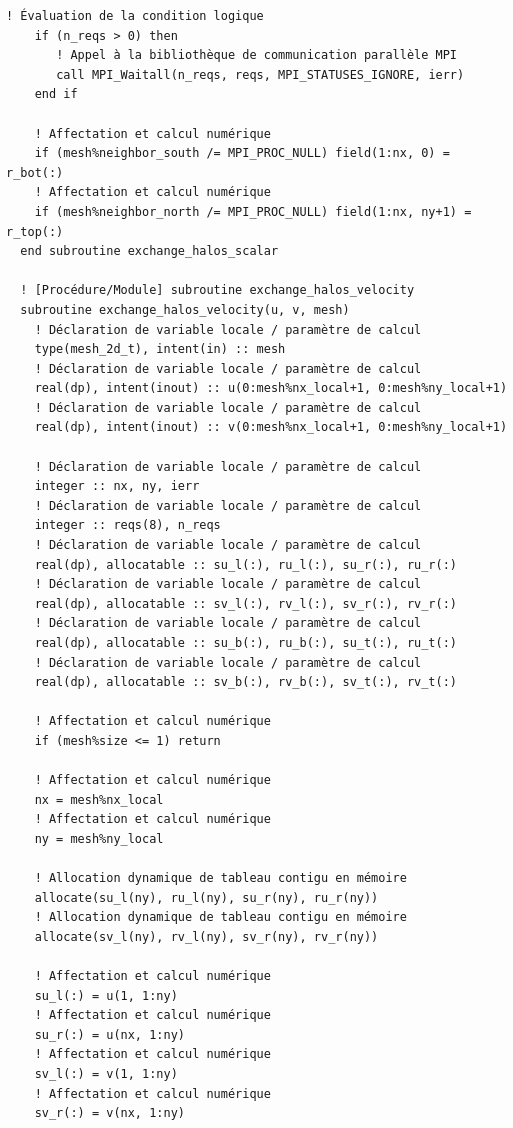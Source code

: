 \documentclass[10pt,a4paper,oneside]{book}
\begin{document}
\begin{lstlisting}[language={[95]Fortran}]
    ! Évaluation de la condition logique
    if (n_reqs > 0) then
       ! Appel à la bibliothèque de communication parallèle MPI
       call MPI_Waitall(n_reqs, reqs, MPI_STATUSES_IGNORE, ierr)
    end if

    ! Affectation et calcul numérique
    if (mesh%neighbor_south /= MPI_PROC_NULL) field(1:nx, 0) = r_bot(:)
    ! Affectation et calcul numérique
    if (mesh%neighbor_north /= MPI_PROC_NULL) field(1:nx, ny+1) = r_top(:)
  end subroutine exchange_halos_scalar

  ! [Procédure/Module] subroutine exchange_halos_velocity
  subroutine exchange_halos_velocity(u, v, mesh)
    ! Déclaration de variable locale / paramètre de calcul
    type(mesh_2d_t), intent(in) :: mesh
    ! Déclaration de variable locale / paramètre de calcul
    real(dp), intent(inout) :: u(0:mesh%nx_local+1, 0:mesh%ny_local+1)
    ! Déclaration de variable locale / paramètre de calcul
    real(dp), intent(inout) :: v(0:mesh%nx_local+1, 0:mesh%ny_local+1)

    ! Déclaration de variable locale / paramètre de calcul
    integer :: nx, ny, ierr
    ! Déclaration de variable locale / paramètre de calcul
    integer :: reqs(8), n_reqs
    ! Déclaration de variable locale / paramètre de calcul
    real(dp), allocatable :: su_l(:), ru_l(:), su_r(:), ru_r(:)
    ! Déclaration de variable locale / paramètre de calcul
    real(dp), allocatable :: sv_l(:), rv_l(:), sv_r(:), rv_r(:)
    ! Déclaration de variable locale / paramètre de calcul
    real(dp), allocatable :: su_b(:), ru_b(:), su_t(:), ru_t(:)
    ! Déclaration de variable locale / paramètre de calcul
    real(dp), allocatable :: sv_b(:), rv_b(:), sv_t(:), rv_t(:)

    ! Affectation et calcul numérique
    if (mesh%size <= 1) return

    ! Affectation et calcul numérique
    nx = mesh%nx_local
    ! Affectation et calcul numérique
    ny = mesh%ny_local

    ! Allocation dynamique de tableau contigu en mémoire
    allocate(su_l(ny), ru_l(ny), su_r(ny), ru_r(ny))
    ! Allocation dynamique de tableau contigu en mémoire
    allocate(sv_l(ny), rv_l(ny), sv_r(ny), rv_r(ny))

    ! Affectation et calcul numérique
    su_l(:) = u(1, 1:ny)
    ! Affectation et calcul numérique
    su_r(:) = u(nx, 1:ny)
    ! Affectation et calcul numérique
    sv_l(:) = v(1, 1:ny)
    ! Affectation et calcul numérique
    sv_r(:) = v(nx, 1:ny)


\end{lstlisting}
\end{document}
